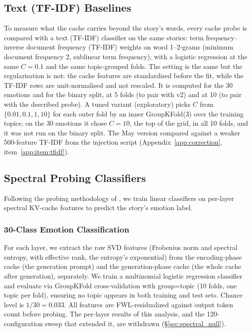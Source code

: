 \documentclass[11pt,a4paper]{article}
\begin{document}
\subsection{Text (TF-IDF) Baselines}
\label{sec:text_baseline_method}

To measure what the cache carries beyond the story's words, every cache probe is compared with a text (TF-IDF) classifier on the same stories: term frequency--inverse document frequency (TF-IDF) weights on word 1--2-grams (minimum document frequency 2, sublinear term frequency), with a logistic regression at the same $C = 0.1$ and the same topic-grouped folds. The setting is the same but the regularisation is not: the cache features are standardised before the fit, while the TF-IDF rows are unit-normalised and not rescaled. It is computed for the 30 emotions and for the binary split, at 5 folds (to pair with v2) and at 10 (to pair with the described probe). A tuned variant (exploratory) picks $C$ from $\{0.01, 0.1, 1, 10\}$ for each outer fold by an inner GroupKFold(3) over the training topics; on the 30 emotions it chose $C = 10$, the top of the grid, in all 10 folds, and it was not run on the binary split. The May version compared against a weaker 500-feature TF-IDF from the injection script (Appendix~\ref{app:correction}, item~\ref{app:item:tfidf}).

\subsection{Spectral Probing Classifiers}
\label{sec:spectral_probe_method}

Following the probing methodology of \citet{belinkov2022probing}, we train linear classifiers on per-layer spectral KV-cache features to predict the story's emotion label.

\subsubsection{30-Class Emotion Classification}

For each layer, we extract the raw SVD features (Frobenius norm and spectral entropy, with effective rank, the entropy's exponential) from the encoding-phase cache (the generation prompt) and the generation-phase cache (the whole cache after generation), separately. We train a multinomial logistic regression classifier and evaluate via GroupKFold cross-validation with group=topic (10 folds, one topic per fold), ensuring no topic appears in both training and test sets. Chance level is $1/30 = 0.033$. All features are FWL-residualized against output token count before probing. The per-layer results of this analysis, and the 120-configuration sweep that extended it, are withdrawn (\S\ref{sec:spectral_null}).
\end{document}
